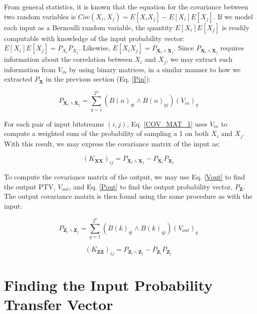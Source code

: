 \documentclass[conference]{IEEEtran}
\begin{document}
From general statistics, it is known that the equation for the covariance between two random variables is $Cov(X_i, X_j) = E[X_iX_j] - E[X_i]E[X_j]$. If we model each input as a Bernoulli random variable, the quantity $E[X_i]E[X_j]$ is readily computable with knowledge of the input probability vector: $E[X_i]E[X_j] = P_{X_i}P_{X_j}$. Likewise, $E[X_iX_j] = P_{\mathbf{X}_i \land \mathbf{X}_j}$. Since $P_{\mathbf{X}_i \land \mathbf{X}_j}$ requires information about the correlation between $X_i$ and $X_j$, we may extract such information from $V_{in}$ by using binary matrices, in a similar manner to how we extracted $P_{\mathbf{X}}$ in the previous section (Eq. \ref{Pin}):

\begin{equation}\label{COV_MAT_1}
P_{\mathbf{X}_i \land \mathbf{X}_j} = \sum_{q=1}^{2^n} (B(n)_{qi} \land B(n)_{qj})(V_{in})_q
\end{equation}

For each pair of input bitstreams $(i, j)$, Eq. \ref{COV_MAT_1} uses $V_{in}$ to compute a weighted sum of the probability of sampling a 1 on both $X_i$ and $X_j$. With this result, we may express the covariance matrix of the input as:

\begin{equation}\label{COV_MAT_2}
(K_{\mathbf{XX}})_{ij} = P_{\mathbf{X}_i \land \mathbf{X}_j} - P_{\mathbf{X}_i}P_{\mathbf{X}_j}
\end{equation}

To compute the covariance matrix of the output, we may use Eq. \ref{Vout} to find the output PTV, $V_{out}$, and Eq. \ref{Pout} to find the output probability vector, $P_{\mathbf{Z}}$. The output covariance matrix is then found using the same procedure as with the input:

\begin{equation}\label{COV_MAT_3}
P_{\mathbf{Z}_i \land \mathbf{Z}_j} = \sum_{q=1}^{2^k} (B(k)_{qi} \land B(k)_{qj})(V_{out})_q
\end{equation}

\begin{equation}\label{COV_MAT_4}
(K_{\mathbf{ZZ}})_{ij} = P_{\mathbf{Z}_i \land \mathbf{Z}_j} - P_{\mathbf{Z}_i}P_{\mathbf{Z}_j}
\end{equation}

\section{Finding the Input Probability Transfer Vector}\label{FINDING_VIN}
\end{document}
